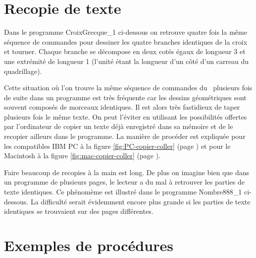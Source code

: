 \section{Recopie de texte} 

Dans le programme {\idt CroixGrecque\_1} ci-dessous on retrouve quatre fois la même
séquence de commandes pour dessiner les quatre
bran\-ches identiques de la croix et tourner. Chaque branche se décompose en deux cotés égaux
de lon\-gueur 3 et une extrémité de lon\-gueur 1 (l'unité
étant la longueur d'un côté d'un carreau  du quadrillage).

\vspace{\baselineskip}
\vspace*{3cm}%
\vspace*{-3cm}%
\label{prog:CroixGrecque_1}


Cette situation où l'on trouve la même séquence de commandes du \robot\ 
plusieurs fois de suite dans un programme est très fréquente car les 
dessins géométriques sont souvent composés de morceaux identiques. Il est alors
très fastidieux de taper plusieurs fois le même texte. On peut l'éviter
en utilisant les possibilités offertes par l'ordinateur de copier un texte
déjà enregistré dans sa mémoire et de le recopier ailleurs dans le 
programme. La manière de procéder est expliquée pour les compatibles 
{\sc IBM PC} à la figure \ref{fig:PC-copier-coller} 
(page \pageref{fig:PC-copier-coller})
et pour le Macintosh à la figure \ref{fig:mac-copier-coller} 
(page \pageref{fig:mac-copier-coller}).



Faire beaucoup de recopies à la main est long. De plus on imagine bien que 
dans un programme de plusieurs pages, le lecteur a du mal à retrouver les 
parties de texte identiques. Ce phénomème est illustré dans le
programme {\idt Nombre888\_1} ci-dessous. La difficulté serait
évidemment encore plus grande si les parties de texte identiques se
trouvaient sur des pages différentes.

\vspace{\baselineskip}
\vspace*{2cm}%
\vspace*{-2cm}%


\section{Exemples de procédures} 

